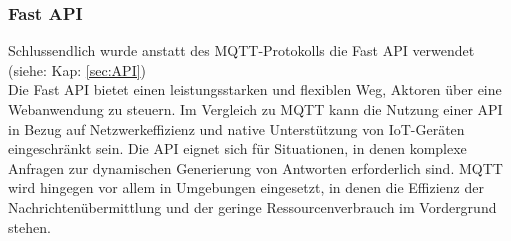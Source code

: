 \subsubsection{Fast API}
Schlussendlich wurde anstatt des MQTT-Protokolls die Fast API verwendet (siehe: Kap: \ref{sec:API})\\
\vspace{3mm}
Die Fast API bietet einen leistungsstarken und flexiblen Weg, Aktoren über eine Webanwendung zu steuern. Im Vergleich zu MQTT kann die Nutzung einer API in Bezug auf Netzwerkeffizienz und native Unterstützung von IoT-Geräten eingeschränkt sein. Die API eignet sich für Situationen, in denen komplexe Anfragen zur dynamischen Generierung von Antworten erforderlich sind. MQTT wird hingegen vor allem in Umgebungen eingesetzt, in denen die Effizienz der Nachrichtenübermittlung und der geringe Ressourcenverbrauch im Vordergrund stehen.

